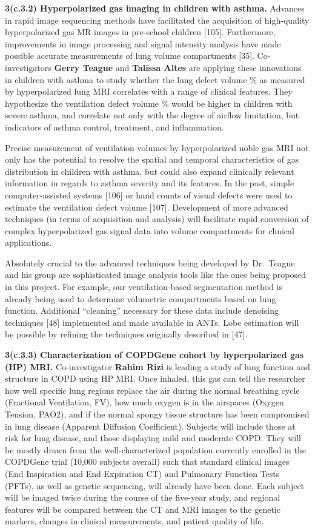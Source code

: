 \documentclass[11pt,]{article}
\begin{document}
\textbf{3(c.3.2) Hyperpolarized gas imaging in children with asthma.}
Advances in rapid image sequencing methods have facilitated the
acquisition of high-quality hyperpolarized gas MR images in pre-school
children {[}105{]}. Furthermore, improvements in image processing and
signal intensity analysis have made possible accurate measurements of
lung volume compartments {[}35{]}. Co-investigators \textbf{Gerry
Teague} and \textbf{Talissa Altes} are applying these innovations in
children with asthma to study whether the lung defect volume \% as
measured by hyperpolarized lung MRI correlates with a range of clinical
features. They hypothesize the ventilation defect volume \% would be
higher in children with severe asthma, and correlate not only with the
degree of airflow limitation, but indicators of asthma control,
treatment, and inflammation.

Precise measurement of ventilation volumes by hyperpolarized noble gas
MRI not only has the potential to resolve the spatial and temporal
characteristics of gas distribution in children with asthma, but could
also expand clinically relevant information in regards to asthma
severity and its features. In the past, simple computer-assisted systems
{[}106{]} or hand counts of visual defects were used to estimate the
ventilation defect volume {[}107{]}. Development of more advanced
techniques (in terms of acquisition and analysis) will facilitate rapid
conversion of complex hyperpolarized gas signal data into volume
compartments for clinical applications.

Absolutely crucial to the advanced techniques being developed by
Dr.~Teague and his group are sophisticated image analysis tools like the
ones being proposed in this project. For example, our ventilation-based
segmentation method is already being used to determine volumetric
compartments based on lung function. Additional ``cleaning'' necessary
for these data include denoising techniques {[}48{]} implemented and
made available in ANTs. Lobe estimation will be possible by refining the
techniques originally described in {[}47{]}.

\textbf{3(c.3.3) Characterization of COPDGene cohort by hyperpolarized
gas (HP) MRI.} Co-investigator \textbf{Rahim Rizi} is leading a study of
lung function and structure in COPD using HP MRI. Once inhaled, this gas
can tell the researcher how well specific lung regions replace the air
during the normal breathing cycle (Fractional Ventilation, FV), how much
oxygen is in the airspaces (Oxygen Tension, PAO2), and if the normal
spongy tissue structure has been compromised in lung disease (Apparent
Diffusion Coefficient). Subjects will include those at risk for lung
disease, and those displaying mild and moderate COPD. They will be
mostly drawn from the well-characterized population currently enrolled
in the COPDGene trial (10,000 subjects overall) such that standard
clinical images (End Inspiration and End Expiration CT) and Pulmonary
Function Tests (PFTs), as well as genetic sequencing, will already have
been done. Each subject will be imaged twice during the course of the
five-year study, and regional features will be compared between the CT
and MRI images to the genetic markers, changes in clinical measurements,
and patient quality of life.
\end{document}
